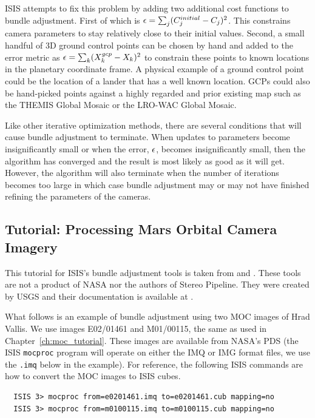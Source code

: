 \ac{ISIS} attempts to fix this problem by adding two additional cost
functions to bundle adjustment. First of which is ${\bf \epsilon} =
\sum_j(C_j^{initial}-C_j)^2$. This constrains camera parameters to
stay relatively close to their initial values. Second, a small handful
of 3D ground control points can be chosen by hand and added to the
error metric as ${\bf \epsilon} = \sum_k(X_k^{gcp}-X_k)^2$ to
constrain these points to known locations in the planetary coordinate
frame. A physical example of a ground control point could be the
location of a lander that has a well known location. \acp{GCP} could also be
hand-picked points against a highly regarded and prior existing map
such as the THEMIS Global Mosaic or the LRO-WAC Global Mosaic.

Like other iterative optimization methods, there are several
conditions that will cause bundle adjustment to terminate. When
updates to parameters become insignificantly small or when the error,
${\bf \epsilon}$, becomes insignificantly small, then the algorithm
has converged and the result is most likely as good as it will get.
However, the algorithm will also terminate when the number of
iterations becomes too large in which case bundle adjustment may or
may not have finished refining the parameters of the cameras.

\subsection{Tutorial: Processing Mars Orbital Camera Imagery}
\label{sec:ba_example}

This tutorial for ISIS's bundle adjustment tools is taken from
\cite{lunokhod:controlnetwork} and \cite{lunokhod:gcp}. These tools
are not a product of NASA nor the authors of Stereo Pipeline. They
were created by USGS and their documentation is available at
\cite{isis:documentation}.

What follows is an example of bundle adjustment using two \ac{MOC}
images of Hrad Vallis. We use images E02/01461 and M01/00115, the same
as used in Chapter~\ref{ch:moc_tutorial}. These images are available from
NASA's \ac{PDS} (the \ac{ISIS} \texttt{mocproc} program will operate
on either the IMQ or IMG format files, we use the \texttt{.imq} below
in the example).  For reference, the following \ac{ISIS} commands are
how to convert the \ac{MOC} images to \ac{ISIS} cubes.

\begin{verbatim}
  ISIS 3> mocproc from=e0201461.imq to=e0201461.cub mapping=no
  ISIS 3> mocproc from=m0100115.imq to=m0100115.cub mapping=no
\end{verbatim}

